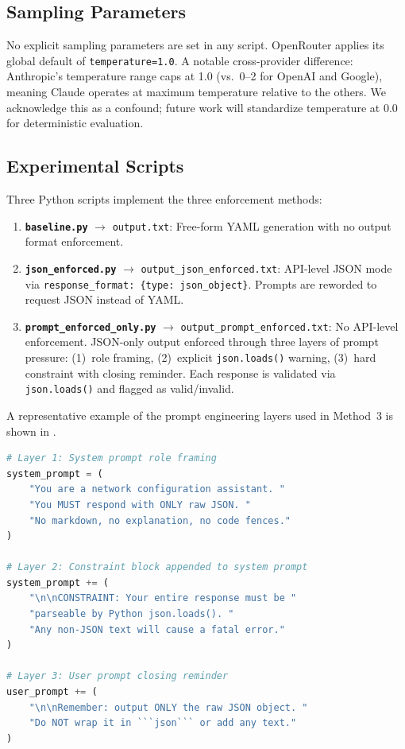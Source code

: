 \documentclass[11pt, letterpaper]{article}
\begin{document}
\subsection{Sampling Parameters}
\label{sec:sampling}

No explicit sampling parameters are set in any script. OpenRouter applies its global default of \texttt{temperature=1.0}. A notable cross-provider difference: Anthropic's temperature range caps at 1.0 (vs.\ 0--2 for OpenAI and Google), meaning Claude operates at maximum temperature relative to the others. We acknowledge this as a confound; future work will standardize temperature at 0.0 for deterministic evaluation.

\subsection{Experimental Scripts}
\label{sec:scripts}

Three Python scripts implement the three enforcement methods:

\begin{enumerate}
    \item \textbf{\texttt{baseline.py}} $\rightarrow$ \texttt{output.txt}: Free-form YAML generation with no output format enforcement.
    \item \textbf{\texttt{json\_enforced.py}} $\rightarrow$ \texttt{output\_json\_enforced.txt}: API-level JSON mode via \texttt{response\_format: \{type: json\_object\}}. Prompts are reworded to request JSON instead of YAML.
    \item \textbf{\texttt{prompt\_enforced\_only.py}} $\rightarrow$ \texttt{output\_prompt\_enforced.txt}: No API-level enforcement. JSON-only output enforced through three layers of prompt pressure: (1)~role framing, (2)~explicit \texttt{json.loads()} warning, (3)~hard constraint with closing reminder. Each response is validated via \texttt{json.loads()} and flagged as valid/invalid.
\end{enumerate}

A representative example of the prompt engineering layers used in Method~3 is shown in .

\begin{lstlisting}[caption={Three-layer prompt enforcement strategy from \texttt{prompt\_enforced\_only.py}.}, label={lst:prompt_layers}, language=Python, basicstyle=\ttfamily\footnotesize]
# Layer 1: System prompt role framing
system_prompt = (
    "You are a network configuration assistant. "
    "You MUST respond with ONLY raw JSON. "
    "No markdown, no explanation, no code fences."
)

# Layer 2: Constraint block appended to system prompt
system_prompt += (
    "\n\nCONSTRAINT: Your entire response must be "
    "parseable by Python json.loads(). "
    "Any non-JSON text will cause a fatal error."
)

# Layer 3: User prompt closing reminder
user_prompt += (
    "\n\nRemember: output ONLY the raw JSON object. "
    "Do NOT wrap it in ```json``` or add any text."
)
\end{lstlisting}
\end{document}
